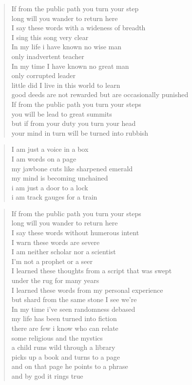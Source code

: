 \documentclass[12pt,a4paper]{article}
\begin{document}
\begin{verse}
If from the public path you turn your step \\
long will you wander to return here \\
I say these words with a wideness of breadth \\
I sing this song very clear \\
In my life i have known no wise man \\
only inadvertent teacher \\
In my time I have known no great man \\
only corrupted leader \\
little did I live in this world to learn \\
good deeds are not rewarded but are occasionally punished \\
If from the public path you turn your steps \\
you will be lead to great summits \\
but if from your duty you turn your head \\
your mind in turn will be turned into rubbish \\ 
\end{verse}
\begin{verse}
I am just a voice in a box \\
I am words on a page \\
my jawbone cuts like sharpened emerald \\
my mind is becoming unchained \\
i am just a door to a lock \\
i am track gauges for a train \\
\end{verse}
\begin{verse}
If from the public path you turn your steps \\
long will you wander to return here \\
I say these words without humerous intent\\
I warn these words are severe\\
I am neither scholar nor a scientist\\
I’m not a prophet or a seer\\
I learned these thoughts from a script that was swept\\
under the rug for many years \\
I learned these words from my personal experience\\
but shard from the same stone I see we’re\\
In my time i've seen randomness debased\\
my life has been turned into fiction\\
there are few i know who can relate\\
some religious and the mystics\\
a child runs wild through a library\\
picks up a book and turns to a page\\
and on that page he points to a phrase\\
and by god it rings true\\
\end{verse}
\end{document}
